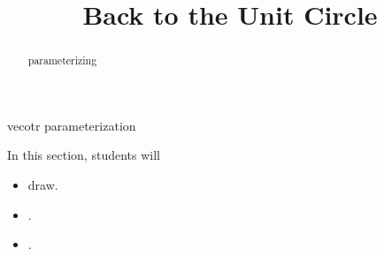 \documentclass{ximera}
\title{Back to the Unit Circle}
\begin{document}
\begin{abstract}
parameterizing
\end{abstract}
\maketitle



vecotr parameterization






















\begin{sectionOutcomes}
In this section, students will 

\begin{itemize}
\item draw.
\item .
\item .
\end{itemize}
\end{sectionOutcomes}
\end{document}
